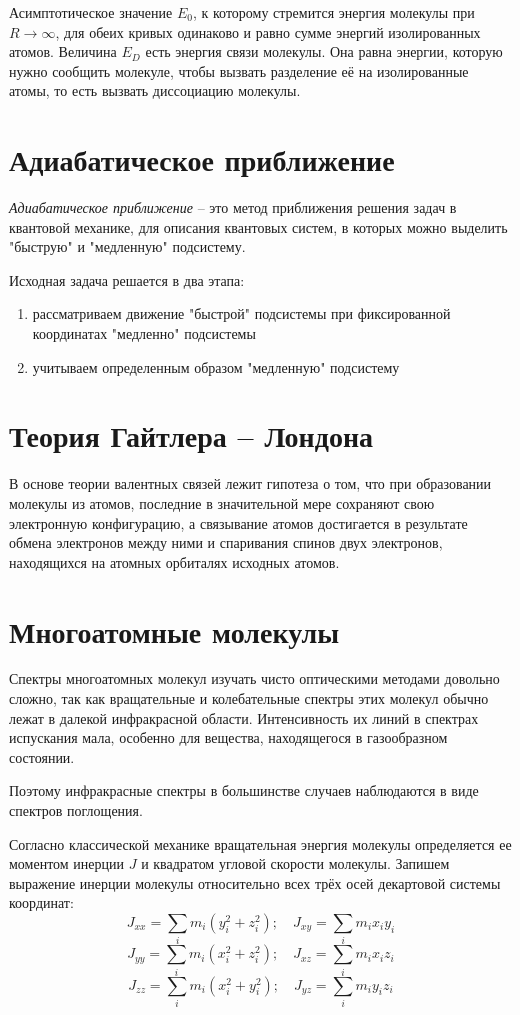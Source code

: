 Асимптотическое значение \( E_0 \), к которому стремится энергия 
молекулы при \( R \rightarrow \infty \), для обеих кривых одинаково 
и равно сумме энергий изолированных атомов. Величина \( E_D \) есть 
энергия связи молекулы. Она равна энергии, которую нужно сообщить 
молекуле, чтобы вызвать разделение её на изолированные атомы, то есть 
вызвать диссоциацию молекулы.


\section{Адиабатическое приближение}
\emph{Адиабатическое приближение} -- это метод приближения решения задач в 
квантовой механике, для описания квантовых систем, в которых можно выделить 
"быструю" и "медленную" подсистему. 

Исходная задача решается в два этапа:
\begin{enumerate}
    \item рассматриваем движение "быстрой" подсистемы при фиксированной 
        координатах "медленно" подсистемы
    \item учитываем определенным образом "медленную" подсистему
\end{enumerate}

\section{Теория Гайтлера -- Лондона}
В основе теории валентных связей лежит гипотеза о том, что при 
образовании молекулы из атомов, последние в значительной мере сохраняют 
свою электронную конфигурацию, а связывание атомов достигается в 
результате обмена электронов между ними и спаривания спинов двух 
электронов, находящихся на атомных орбиталях исходных атомов. 

\section{Многоатомные молекулы}
Спектры многоатомных молекул изучать чисто оптическими методами
довольно сложно, так как вращательные и колебательные спектры этих
молекул обычно лежат в далекой инфракрасной области. Интенсивность их
линий в спектрах испускания мала, особенно для вещества, находящегося в
газообразном состоянии.

Поэтому инфракрасные спектры в большинстве случаев наблюдаются в
виде спектров поглощения.

Согласно классической механике вращательная энергия молекулы
определяется ее моментом инерции \( J \) и квадратом угловой скорости
молекулы. Запишем выражение инерции молекулы относительно всех трёх 
осей декартовой системы координат:
\[ 
	J_{xx} = \sum_i m_i\left( y^2_i + z^2_i \right);\quad
	J_{xy} = \sum_i m_i x_i y_i
\]
\[ 
	J_{yy} = \sum_i m_i\left( x^2_i + z^2_i \right);\quad
	J_{xz} = \sum_i m_i x_i z_i
\]
\[ 
	J_{zz} = \sum_i m_i\left( x^2_i + y^2_i \right);\quad
	J_{yz} = \sum_i m_i y_i z_i
\]

